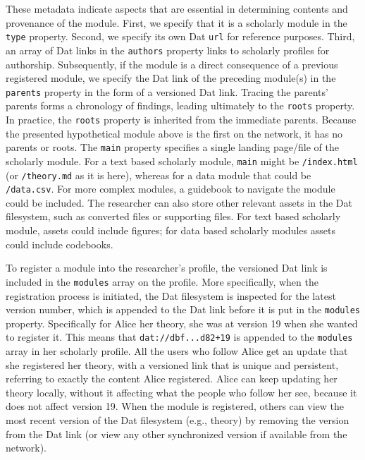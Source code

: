 \documentclass[a4paper]{article}
\begin{document}
These metadata indicate aspects that are essential in determining
contents and provenance of the module. First, we specify that it is a
scholarly module in the \texttt{type} property. Second, we specify its
own Dat \texttt{url} for reference purposes. Third, an array of Dat
links in the \texttt{authors} property links to scholarly profiles for
authorship. Subsequently, if the module is a direct consequence of a
previous registered module, we specify the Dat link of the preceding
module(s) in the \texttt{parents} property in the form of a versioned
Dat link. Tracing the parents' parents forms a chronology of findings,
leading ultimately to the \texttt{roots} property. In practice, the
\texttt{roots} property is inherited from the immediate parents. Because
the presented hypothetical module above is the first on the network, it
has no parents or roots. The \texttt{main} property specifies a single
landing page/file of the scholarly module. For a text based scholarly
module, \texttt{main} might be \texttt{/index.html} (or
\texttt{/theory.md} as it is here), whereas for a data module that could
be \texttt{/data.csv}. For more complex modules, a guidebook to navigate
the module could be included. The researcher can also store other
relevant assets in the Dat filesystem, such as converted files or
supporting files. For text based scholarly module, assets could include
figures; for data based scholarly modules assets could include
codebooks.

To register a module into the researcher's profile, the versioned Dat
link is included in the \texttt{modules} array on the profile. More
specifically, when the registration process is initiated, the Dat
filesystem is inspected for the latest version number, which is appended
to the Dat link before it is put in the \texttt{modules} property.
Specifically for Alice her theory, she was at version 19 when she wanted
to register it. This means that \texttt{dat://dbf...d82+19} is appended
to the \texttt{modules} array in her scholarly profile. All the users
who follow Alice get an update that she registered her theory, with a
versioned link that is unique and persistent, referring to exactly the
content Alice registered. Alice can keep updating her theory locally,
without it affecting what the people who follow her see, because it does
not affect version 19. When the module is registered, others can view
the most recent version of the Dat filesystem (e.g., theory) by removing
the version from the Dat link (or view any other synchronized version if
available from the network).
\end{document}
